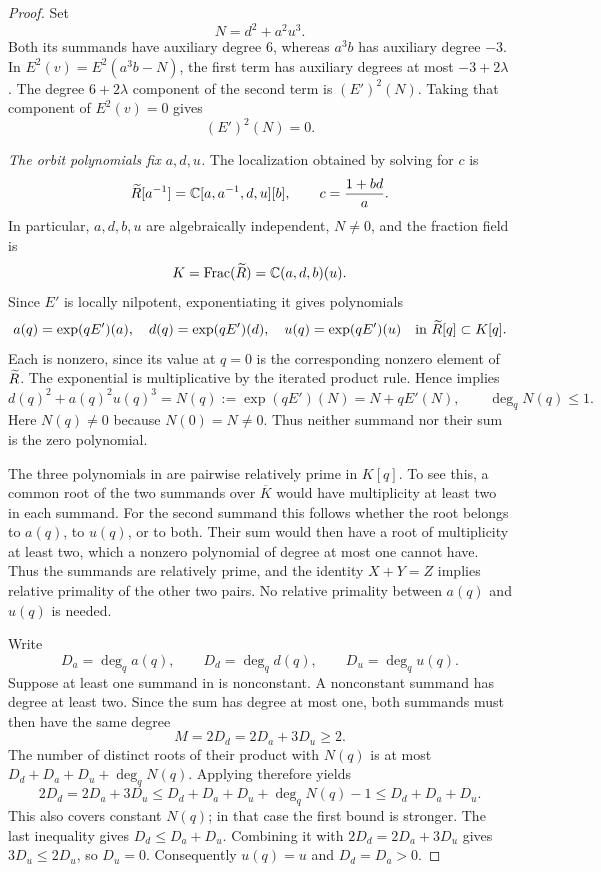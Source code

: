 \begin{proof}
Set
\[
 N=d^2+a^2u^3.
\]
Both its summands have auxiliary degree $6$, whereas $a^3b$ has
auxiliary degree $-3$.  In $E^2(v)=E^2(a^3b-N)$, the first term
has auxiliary degrees at most $-3+2\lambda$.  The degree
$6+2\lambda$ component of the second term is $(E')^2(N)$.
Taking that component of $E^2(v)=0$ gives
\begin{equation}\label{rig:linear-orbit}
 (E')^2(N)=0.
\end{equation}

\medskip\noindent
\emph{The orbit polynomials fix $a,d,u$.}
The localization obtained by solving for $c$ is
\begin{equation}\label{rig:a-chart}
 \widetilde R[a^{-1}]=\mathbb C[a,a^{-1},d,u][b],
 \qquad c=\frac{1+bd}{a}.
\end{equation}
In particular, $a,d,b,u$ are algebraically independent,
$N\ne0$, and the fraction field is
\begin{equation}\label{rig:original-field}
 K=\operatorname{Frac}(\widetilde R)=\mathbb C(a,d,b)(u).
\end{equation}
Since $E'$ is locally nilpotent, exponentiating it gives
polynomials
\[
 a(q)=\exp(qE')(a),\quad
 d(q)=\exp(qE')(d),\quad
 u(q)=\exp(qE')(u)
 \quad\text{in }\widetilde R[q]\subset K[q].
\]
Each is nonzero, since its value at $q=0$ is the corresponding
nonzero element of $\widetilde R$.  The exponential is multiplicative
by the iterated product rule.  Hence 
implies
\begin{equation}\label{rig:orbit-sum}
 d(q)^2+a(q)^2u(q)^3
 =N(q):=\exp(qE')(N)=N+qE'(N),
 \qquad \deg_q N(q)\le1.
\end{equation}
Here $N(q)\ne0$ because $N(0)=N\ne0$.  Thus neither summand nor
their sum is the zero polynomial.

The three polynomials in  are pairwise
relatively prime in $K[q]$.  To see this, a common root of the
two summands over $\overline K$ would have multiplicity at least
two in each summand.  For the second summand this follows
whether the root belongs to $a(q)$, to $u(q)$, or to both.
Their sum would then have a root of multiplicity at least two,
which a nonzero polynomial of degree at most one cannot have.
Thus the summands are relatively prime, and the identity
$X+Y=Z$ implies relative primality of the other two pairs.
No relative primality between $a(q)$ and $u(q)$ is needed.

Write
\[
 D_a=\deg_q a(q),\qquad D_d=\deg_q d(q),\qquad
 D_u=\deg_q u(q).
\]
Suppose at least one summand in  is
nonconstant.  A nonconstant summand has degree at least two.
Since the sum has degree at most one, both summands must then
have the same degree
\[
 M=2D_d=2D_a+3D_u\ge2.
\]
The number of distinct roots of their product with $N(q)$ is
at most $D_d+D_a+D_u+\deg_q N(q)$.  Applying 
therefore yields
\begin{equation}\label{rig:degree-bound}
 2D_d=2D_a+3D_u
 \le D_d+D_a+D_u+\deg_q N(q)-1
 \le D_d+D_a+D_u.
\end{equation}
This also covers constant $N(q)$; in that case the first bound
is stronger.  The last inequality gives $D_d\le D_a+D_u$.
Combining it with $2D_d=2D_a+3D_u$ gives $3D_u\le2D_u$,
so $D_u=0$.  Consequently $u(q)=u$ and
$D_d=D_a>0$.


\end{proof}
